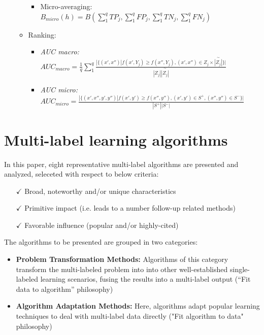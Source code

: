 \documentclass[12pt]{report}
\begin{document}
\begin{itemize}
\begin{itemize}
\begin{itemize}
				\item Micro-averaging: $B_{micro}(h) = B(\sum_{1}^{q}TP_j, \sum_{1}^{q}FP_j, \sum_{1}^{q}TN_j, \sum_{1}^{q}FN_j)$
			\end{itemize}
			\item Ranking:
			\begin{itemize}
				\item \emph{AUC macro: }$AUC_{macro} = \frac{1}{q} \sum_{1}^{q} \frac{|\{(x', x'') | f(x',Y_j) \geq f(x'',Y_j), (x',x'') \in Z_j \times \overset{\sim}{|Z_j|} \}|}{|Z_j|{\overset{\sim}{|Z_j|}}}$
				\item \emph{AUC micro: }$AUC_{micro} = \frac{|\{(x',x'',y',y'') | f(x',y') \geq f(x'',y''), (x',y') \in S^+, (x'',y'') \in S^- \}|}{|S^+||S^-|}$
			\end{itemize}
		\end{itemize} 
	\end{itemize}
	
	\section*{Multi-label learning algorithms}
	In this paper, eight representative multi-label algorithms are presented and analyzed, seleceted with respect to below criteria:
	\begin{itemize}
		\item[$\checkmark$] Broad, noteworthy and/or unique characteristics
		\item[$\checkmark$] Primitive impact (i.e. leads to a number follow-up related methods)
		\item[$\checkmark$] Favorable influence (popular and/or highly-cited) 
	\end{itemize}
	
	The algorithms to be presented are grouped in two categories:
	\begin{itemize}
		\item \textbf{Problem Transformation Methods: }Algorithms of this category
      transform the multi-labeled problem into into other well-established
      single-labeled learning scenarios, fusing the results into a multi-label output (``Fit data to algorithm'' philosophy)
		\item \textbf{Algorithm Adaptation Methods: }Here, algorithms adapt popular learning techniques to deal with multi-label data directly ("Fit algorithm to data" philosophy)
	\end{itemize}
\end{document}
